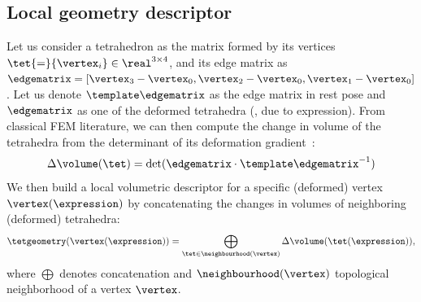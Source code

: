   \subsection{Local geometry descriptor}
    \label{sec:blendfields-similarity}
    Let us consider a tetrahedron as the matrix formed by its vertices~$\tet {=}
      \{\vertex_i\} \in \real^{3 \times 4}$, and its edge matrix as $\edgematrix =
      [\vertex_3-\vertex_0, \vertex_2-\vertex_0, \vertex_1-\vertex_0]$.
    Let us denote $\template\edgematrix$ as the edge matrix in rest pose and
    $\edgematrix$ as one of the deformed tetrahedra (\ie, due to expression).
    From classical FEM literature, we can then compute the change in volume of the tetrahedra from the determinant of its deformation gradient~\cite{irving2004invertible}:
    \begin{equation}
      \label{eq:blendfields-volume}
      \Delta \volume(\tet) = \text{det}(\edgematrix \cdot \template\edgematrix^{-1})
    \end{equation}
    We then build a local volumetric descriptor for a specific (deformed) vertex $\vertex(\expression)$ by concatenating the changes in volumes of neighboring (deformed) tetrahedra:
    \begin{align}
      \label{eq:blendfields-local-descriptor}
      \tetgeometry(\vertex(\expression)) =
      \bigoplus_{\tet \in \neighbourhood(\vertex)}
      \Delta \volume(\tet(\expression)),
    \end{align}
    where $\bigoplus$ denotes concatenation and $\neighbourhood(\vertex)$ topological neighborhood of a vertex $\vertex$.
    

    
    
